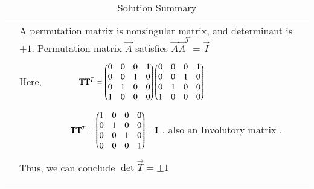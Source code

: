 \documentclass[journal,12pt]{IEEEtran}
\begin{document}
\begin{longtable}{|p{5cm}|p{13cm}|}
	& A permutation matrix is nonsingular matrix, and determinant is $\pm 1$. Permutation matrix $\vec{A}$ satisfies $\vec{A}{\vec{A}^{T}}=\vec{I}$\\
	
	&\\
	& Here, $\qquad\qquad\mathbf{T}\mathbf{T}^{T}=\begin{pmatrix}0&0&0&1\\0&0&1&0\\0&1&0&0\\1&0&0&0\end{pmatrix}\begin{pmatrix}0&0&0&1\\0&0&1&0\\0&1&0&0\\1&0&0&0\end{pmatrix}$\\
	&\\
	&$\qquad\qquad\qquad\mathbf{T}\mathbf{T}^{T}=\begin{pmatrix}1&0&0&0\\0&1&0&0\\0&0&1&0\\0&0&0&1\end{pmatrix} = \mathbf{I}$ , also an Involutory matrix .\\
	&\\
	& Thus, we can conclude $\det{\vec{T}}=\pm1$\\
	&\\
	\hline
	\caption{Solution Summary}
    \label{table:1}
\end{longtable}
\end{document}
